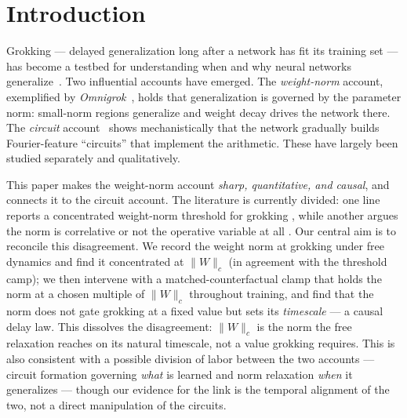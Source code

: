 \documentclass[10pt,twocolumn]{article}
\newcommand{\Wc}{\|W\|_{c}}
\begin{document}
\section{Introduction}
Grokking --- delayed generalization long after a network has fit its training set --- has become a
testbed for understanding when and why neural networks generalize~\citep{power2022grokking}. Two influential
accounts have emerged. The \emph{weight-norm} account, exemplified by \emph{Omnigrok}~\citep{liu2022omnigrok},
holds that generalization is governed by the parameter norm: small-norm regions generalize and weight decay
drives the network there. The \emph{circuit} account~\citep{nanda2023progress} shows mechanistically that
the network gradually builds Fourier-feature ``circuits'' that implement the arithmetic. These have largely
been studied separately and qualitatively.

This paper makes the weight-norm account \emph{sharp, quantitative, and causal}, and connects it to the
circuit account. The literature is currently divided: one line reports a concentrated weight-norm threshold
for grokking \citep{liu2022omnigrok,systematic2026grokking,neuralcollapse2026}, while another argues the
norm is correlative or not the operative variable at all
\citep{golechha2024progress,minegishi2023grokking,notsawo2025euclidean,nonstationarity2025}. Our central
aim is to reconcile this disagreement. We record the weight norm at grokking under free dynamics and find
it concentrated at $\Wc$ (in agreement with the threshold camp); we then intervene with a
matched-counterfactual clamp that holds the norm at a chosen multiple of $\Wc$ throughout training, and find
that the norm does not gate grokking at a fixed value but sets its \emph{timescale} --- a causal delay law.
This dissolves the disagreement: $\Wc$ is the norm the free relaxation reaches on its natural timescale, not
a value grokking requires. This is also consistent with a possible division of labor between the two
accounts --- circuit formation governing \emph{what} is learned and norm relaxation \emph{when} it
generalizes --- though our evidence for the link is the temporal alignment of the two, not a direct
manipulation of the circuits.
\end{document}
